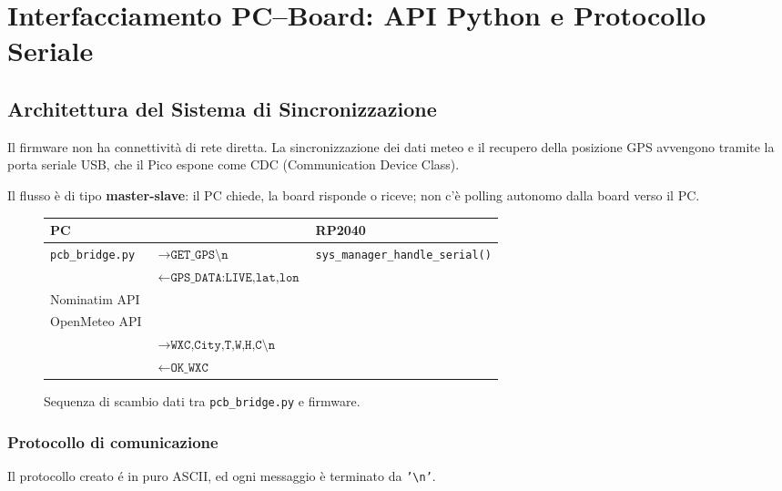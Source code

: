 
\newpage

\section{Interfacciamento PC--Board: API Python e Protocollo Seriale}


\subsection{Architettura del Sistema di Sincronizzazione}

Il firmware non ha connettività di rete diretta. La sincronizzazione dei dati meteo e il recupero della posizione
GPS avvengono tramite la porta seriale USB, che il Pico espone come CDC
(Communication Device Class).

Il flusso è di tipo \textbf{master-slave}: il PC chiede, la board risponde o riceve; non c'è polling autonomo dalla board verso il PC.

\begin{figure}[h]
	\centering
	\begin{tabular}{lll}
		\textbf{PC} & & \textbf{RP2040} \\
		\hline
		\texttt{pcb\_bridge.py} & $\rightarrow{\texttt{GET\_GPS\textbackslash n}}$ & \texttt{sys\_manager\_handle\_serial()} \\
		& $\leftarrow{\texttt{GPS\_DATA:LIVE,lat,lon}}$ & \\
		Nominatim API & & \\
		OpenMeteo API & & \\
		& $\rightarrow{\texttt{WXC,City,T,W,H,C\textbackslash n}}$ & \\
		& $\leftarrow{\texttt{OK\_WXC}}$ & \\
	\end{tabular}
	\caption{Sequenza di scambio dati tra \texttt{pcb\_bridge.py} e firmware.}
\end{figure}

\subsubsection*{Protocollo di comunicazione}

Il protocollo creato é in puro ASCII, ed ogni messaggio è terminato da \texttt{'\textbackslash n'}.

